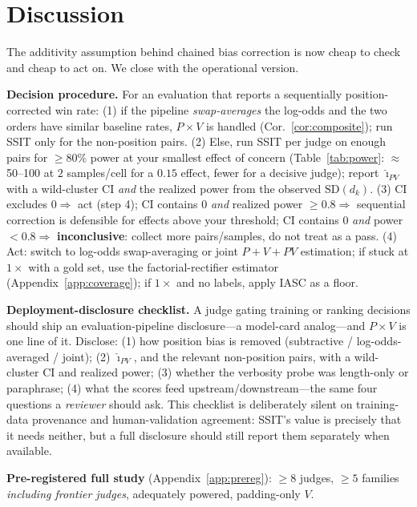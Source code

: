 \documentclass{article}
\begin{document}
\section{Discussion}
\label{sec:discussion}
\label{sec:limitations}

The additivity assumption behind chained bias correction is now
cheap to check and cheap to act on. We close with the operational
version.

\textbf{Decision procedure.} For an evaluation that reports a
sequentially position-corrected win rate: (1) if the pipeline
\emph{swap-averages} the log-odds and the two orders have similar
baseline rates, $P{\times}V$ is handled (Cor.~\ref{cor:composite});
run SSIT only for the non-position pairs. (2) Else, run SSIT per
judge on enough pairs for $\geq\!80\%$ power at your smallest effect
of concern (Table~\ref{tab:power}: $\approx$50--100 at $2$
samples/cell for a $0.15$ effect, fewer for a decisive judge);
report $\hat\imath_{PV}$ with a wild-cluster CI \emph{and} the
realized power from the observed $\mathrm{SD}(d_k)$. (3) CI excludes
$0\Rightarrow$ act (step 4); CI contains $0$ \emph{and} realized
power $\geq\!0.8\Rightarrow$ sequential correction is defensible for
effects above your threshold; CI contains $0$ \emph{and} power
$<\!0.8\Rightarrow$ \textbf{inconclusive}: collect more
pairs/samples, do not treat as a pass. (4) Act: switch to log-odds
swap-averaging or joint $P{+}V{+}PV$ estimation; if stuck at
$1\times$ with a gold set, use the factorial-rectifier estimator
(Appendix~\ref{app:coverage}); if $1\times$ and no labels, apply
IASC as a floor.

\textbf{Deployment-disclosure checklist.} A judge gating training or
ranking decisions should ship an evaluation-pipeline
disclosure---a model-card analog---and $P{\times}V$ is one line of
it. Disclose: (1) how position bias is removed (subtractive /
log-odds-averaged / joint); (2) $\hat\imath_{PV}$, and the relevant
non-position pairs, with a wild-cluster CI and realized power; (3)
whether the verbosity probe was length-only or paraphrase; (4) what
the scores feed upstream/downstream---the same four questions a
\emph{reviewer} should ask. This checklist is deliberately silent on
training-data provenance and human-validation agreement: SSIT's
value is precisely that it needs neither, but a full disclosure
should still report them separately when available.

\textbf{Pre-registered full study} (Appendix~\ref{app:prereg}):
$\geq\!8$ judges, $\geq\!5$ families \emph{including frontier
judges}, adequately powered, padding-only $V$.
\end{document}

